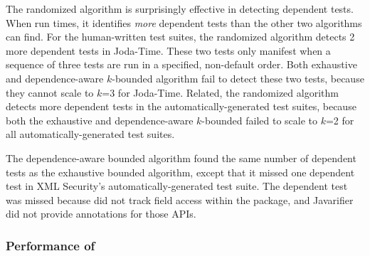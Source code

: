 




The randomized algorithm is surprisingly effective in
detecting dependent tests. When run \trialnum times,
it identifies \textit{more} dependent tests than the other
two algorithms can find. For the human-written
test suites, the randomized algorithm detects 2 more dependent
tests in Joda-Time. These two tests only
manifest when a sequence of three tests are run in a specified,
non-default order. Both exhaustive and dependence-aware $k$-bounded
algorithm fail to detect these two tests, because
they cannot scale to $k$=3 for 
Joda-Time. Related, the randomized algorithm
detects more dependent
tests in the automatically-generated test suites,
because both the exhaustive and dependence-aware $k$-bounded
failed to scale to $k$=2 for all automatically-generated test suites.

The dependence-aware bounded algorithm found the same
number of dependent tests as the exhaustive bounded algorithm, except
that it missed one dependent test in XML Security's
automatically-generated test suite.
The dependent test was missed because \ourtool
did not track field access within the  package,
and Javarifier did not provide annotations for those APIs.


\subsubsection{Performance of \ourtool}
\label{sec:performance}


